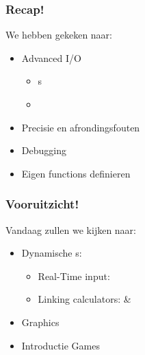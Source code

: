 
\begin{frame}
\frametitle{Recap!}


We hebben gekeken naar:
\begin{itemize}
	\item<2-> Advanced I/O
		\begin{itemize}
		  \item<3-> s
		  \item<4-> 
		\end{itemize}
	\item<6-> Precisie en afrondingsfouten
	\item<7-> Debugging
	\item<8-> Eigen functions definieren
\end{itemize}
\end{frame}

\begin{frame}
\frametitle{Vooruitzicht!}

Vandaag zullen we kijken naar:
\begin{itemize}
	\item<2-> Dynamische s:
		\begin{itemize}
		  \item<3-> Real-Time input: 
		  \item<4-> Linking calculators:  \& 
		\end{itemize}
	\item<5-> Graphics
	\item<6-> Introductie Games
\end{itemize}

\end{frame}


